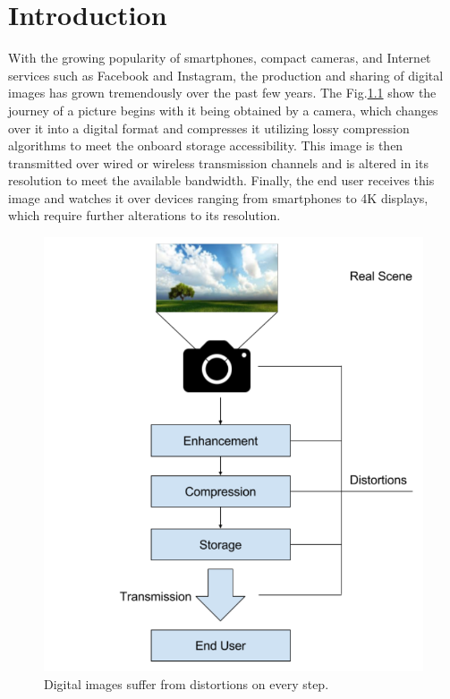 \chapter{Introduction}

With the growing popularity of smartphones, compact cameras, and Internet services such as Facebook and Instagram, the production and sharing of digital images has grown tremendously over the past few years.  
The Fig.\ref{fig:digimgs} show the journey of a picture begins with it being obtained by a camera, which changes over it into a digital format and compresses it utilizing lossy compression algorithms to meet the onboard storage accessibility. 
This image is then transmitted over wired or wireless transmission channels and is altered in its resolution to meet the available bandwidth. 
Finally, the end user receives this image and watches it over devices ranging from smartphones to 4K displays, which require further alterations to its resolution. 

\begin{figure}[H]
  \includegraphics[width=\linewidth]{figures/digitalsteps.png}
  \caption{Digital images suffer from distortions on every step.}
  \label{fig:digimgs}  
\end{figure}
  
